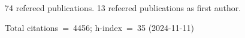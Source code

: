 74 refereed publications. 13 refeered publications as first author.

Total citations~=~4456; h-index~=~35 (2024-11-11)